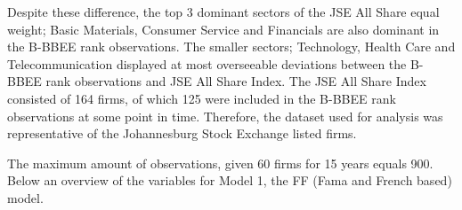 Despite these difference, the top 3 dominant sectors of the JSE All Share equal weight; Basic Materials, Consumer Service and Financials are also dominant in the B-BBEE rank observations. The smaller sectors; Technology, Health Care and Telecommunication displayed at most overseeable deviations between the B-BBEE rank observations and JSE All Share Index. The JSE All Share Index consisted of 164 firms, of which 125 were included in the B-BBEE rank observations at some point in time. Therefore, the dataset used for analysis was representative of the Johannesburg Stock Exchange listed firms.

The maximum amount of observations, given 60 firms for 15 years equals 900. Below an overview of the variables for Model 1, the FF (Fama and French based) model.  
\begin{table}[H] %
\centering
\caption{Descriptive statistics variables} 
\end{table} 
